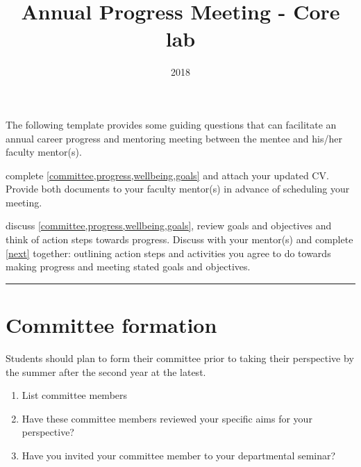 \documentclass[12pt]{article}
\title{Annual Progress Meeting - Core lab}
\date{2018}
\newcommand{\tbox}{\\ \framebox[\linewidth][l]{\phantom{X}}}
\begin{document}
\noindent
The following template provides some guiding questions that can facilitate an
annual career progress and mentoring meeting between the mentee and his/her
faculty mentor(s).

\begin{description}[leftmargin=0pt]
\item[Student / Postdoc:] complete \cref{committee,progress,wellbeing,goals} and
  attach your updated CV.  Provide both documents to your faculty mentor(s) in
  advance of scheduling your meeting.
\item[Student / Postdoc and Faculty Mentor(s):] discuss
  \cref{committee,progress,wellbeing,goals}, review goals and objectives and
  think of action steps towards progress.  Discuss with your mentor(s) and
  complete \cref{next} together: outlining action steps and activities you agree
  to do towards making progress and meeting stated goals and objectives.
\end{description}

\noindent\rule{\linewidth}{0.4pt}

\section{Committee formation}\label{committee}
Students should plan to form their committee prior to taking their perspective
by the summer after the second year at the latest.
\begin{enumerate}
\item List committee members \tbox{}
\item Have these committee members reviewed your specific aims for your
  perspective?  \tbox{}
\item Have you invited your committee member to your departmental seminar?
  \tbox{}
\end{enumerate}
\end{document}
